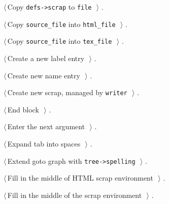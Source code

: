 \documentclass[a4paper]{report}
\begin{document}
{\begin{list}{}{\setlength{\itemsep}{-\parsep}\setlength{\itemindent}{-\leftmargin}}
\item $\langle\,$Copy \verb|defs->scrap| to \verb|file|\nobreak\ {\footnotesize {}}$\,\rangle$ {\footnotesize {\NWtxtRefIn} .}
\item $\langle\,$Copy \verb|source_file| into \verb|html_file|\nobreak\ {\footnotesize {}}$\,\rangle$ {\footnotesize {\NWtxtRefIn} .}
\item $\langle\,$Copy \verb|source_file| into \verb|tex_file|\nobreak\ {\footnotesize {}}$\,\rangle$ {\footnotesize {\NWtxtRefIn} .}
\item $\langle\,$Create a new label entry\nobreak\ {\footnotesize {}}$\,\rangle$ {\footnotesize {\NWtxtRefIn} .}
\item $\langle\,$Create new name entry\nobreak\ {\footnotesize {}}$\,\rangle$ {\footnotesize {\NWtxtRefIn} .
}
\item $\langle\,$Create new scrap, managed by \verb|writer|\nobreak\ {\footnotesize {}}$\,\rangle$ {\footnotesize {\NWtxtRefIn} .}
\item $\langle\,$End block\nobreak\ {\footnotesize {}}$\,\rangle$ {\footnotesize {\NWtxtRefIn} .
}
\item $\langle\,$Enter the next argument\nobreak\ {\footnotesize {}}$\,\rangle$ {\footnotesize {\NWtxtRefIn} .}
\item $\langle\,$Expand tab into spaces\nobreak\ {\footnotesize {}}$\,\rangle$ {\footnotesize {\NWtxtRefIn} .
}
\item $\langle\,$Extend goto graph with \verb|tree->spelling|\nobreak\ {\footnotesize {}}$\,\rangle$ {\footnotesize {\NWtxtRefIn} .}
\item $\langle\,$Fill in the middle of HTML scrap environment\nobreak\ {\footnotesize {}}$\,\rangle$ {\footnotesize {\NWtxtRefIn} .
}
\item $\langle\,$Fill in the middle of the scrap environment\nobreak\ {\footnotesize {}}$\,\rangle$ {\footnotesize {\NWtxtRefIn} .
}
\end{list}}
\end{document}
